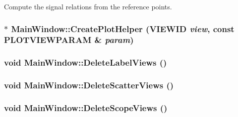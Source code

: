 Compute the signal relations from the reference points. 

\hypertarget{class_main_window_c20f79a0babf3630416d943e15d72c15}{
\subsubsection[{CreatePlotHelper}]{ $\ast$ MainWindow::CreatePlotHelper ({\bf VIEWID} {\em view}, \/  const {\bf PLOTVIEWPARAM} \& {\em param})}}
\label{class_main_window_c20f79a0babf3630416d943e15d72c15}


\hypertarget{class_main_window_53f90a91aeb11d41d7d7015ff660ddc8}{
\subsubsection[{DeleteLabelViews}]{\setlength{\rightskip}{0pt plus 5cm}void MainWindow::DeleteLabelViews ()}}
\label{class_main_window_53f90a91aeb11d41d7d7015ff660ddc8}


\hypertarget{class_main_window_6147ba7241a82f7392cc5a542d76047f}{
\subsubsection[{DeleteScatterViews}]{\setlength{\rightskip}{0pt plus 5cm}void MainWindow::DeleteScatterViews ()}}
\label{class_main_window_6147ba7241a82f7392cc5a542d76047f}


\hypertarget{class_main_window_893768508cc5cac2bbd01135ff53a23c}{
\subsubsection[{DeleteScopeViews}]{\setlength{\rightskip}{0pt plus 5cm}void MainWindow::DeleteScopeViews ()}}
\label{class_main_window_893768508cc5cac2bbd01135ff53a23c}


